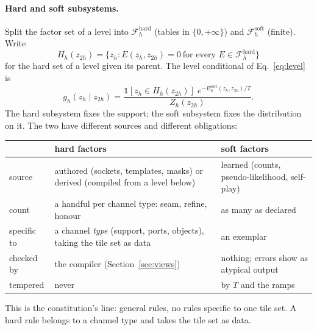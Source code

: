 \documentclass[11pt]{article}
\newcommand{\1}{\mathds{1}}
\begin{document}
\paragraph{Hard and soft subsystems.} Split the factor set of a level into
$\mathcal F^{\mathrm{hard}}_h$ (tables in $\{0, +\infty\}$) and
$\mathcal F^{\mathrm{soft}}_h$ (finite). Write
\[
  H_h(z_{2h}) = \big\{ z_h : E(z_h, z_{2h}) = 0 \ \text{for every } E \in \mathcal F^{\mathrm{hard}}_h \big\}
\]
for the hard set of a level given its parent. The level conditional of
Eq.~\eqref{eq:level} is
\[
  g_h(z_h \mid z_{2h}) = \frac{\1[z_h \in H_h(z_{2h})]\; e^{-E^{\mathrm{soft}}_h(z_h, z_{2h})/T}}{Z_h(z_{2h})} .
\]
The hard subsystem fixes the support; the soft subsystem fixes the
distribution on it. The two have different sources and different obligations:
\begin{center}
\small
\begin{tabular}{@{}lp{2.9in}p{2.1in}@{}}
\toprule
 & hard factors & soft factors \\
\midrule
source & authored (sockets, templates, masks) or derived (compiled from a level below) & learned (counts, pseudo-likelihood, self-play) \\
count & a handful per channel type: seam, refine, honour & as many as declared \\
specific to & a channel \emph{type} (support, ports, objects), taking the tile set as data & an exemplar \\
checked by & the compiler (Section~\ref{sec:views}) & nothing; errors show as atypical output \\
tempered & never & by $T$ and the ramps \\
\bottomrule
\end{tabular}
\end{center}
This is the constitution's line: general rules, no rules specific to one tile
set. A hard rule belongs to a channel type and takes the tile set as data.
\end{document}
